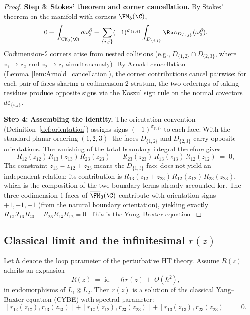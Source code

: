 \begin{proof}
\noindent\textbf{Step 3: Stokes' theorem and corner cancellation.}
By Stokes' theorem on the manifold with corners $\FM_3(\C)$,
\[
0 = \int_{\FM_3(\C)} d\omega_3^{\partial} = \sum_{\{i,j\}} (-1)^{\sigma_{\{i,j\}}} \int_{D_{\{i,j\}}} \Res_{D_{\{i,j\}}}(\omega_3^{\partial}).
\]
Codimension-2 corners arise from nested collisions (e.g., $D_{\{1,2\}} \cap D_{\{2,3\}}$, where $z_1 \to z_2$ and $z_2 \to z_3$ simultaneously). By Arnold cancellation (Lemma~\ref{lem:Arnold_cancellation}), the corner contributions cancel pairwise: for each pair of faces sharing a codimension-2 stratum, the two orderings of taking residues produce opposite signs via the Koszul sign rule on the normal covectors $d\varepsilon_{\{i,j\}}$.

\medskip
\noindent\textbf{Step 4: Assembling the identity.}
The orientation convention (Definition~\ref{def:orientation}) assigns signs $(-1)^{\sigma_{\{i,j\}}}$ to each face. With the standard planar ordering $(1,2,3)$, the faces $D_{\{1,2\}}$ and $D_{\{2,3\}}$ carry opposite orientations. The vanishing of the total boundary integral therefore gives
\[
R_{12}(z_{12})\,R_{13}(z_{13})\,R_{23}(z_{23}) \;-\; R_{23}(z_{23})\,R_{13}(z_{13})\,R_{12}(z_{12}) \;=\; 0,
\]
The constraint $z_{13} = z_{12} + z_{23}$ means the $D_{\{1,3\}}$ face does not yield an independent relation: its contribution is $R_{13}(z_{12}+z_{23})\,R_{12}(z_{12})\,R_{23}(z_{23})$, which is the composition of the two boundary terms already accounted for. The three codimension-$1$ faces of $\overline{\FM}_3(\C)$ contribute with orientation signs $+1, +1, -1$ (from the natural boundary orientation), yielding exactly $R_{12}R_{13}R_{23} - R_{23}R_{13}R_{12} = 0$. This is the Yang--Baxter equation.
\end{proof}

\subsection{Classical limit and the infinitesimal $r(z)$}
Let $\hbar$ denote the loop parameter of the perturbative HT theory.
Assume $R(z)$ admits an expansion
\[
R(z) \;=\; \mathrm{id} \,+\, \hbar\, r(z) \,+\, O(\hbar^2),
\]
in endomorphisms of $L_1\otimes L_2$.
Then $r(z)$ is a solution of the classical Yang–Baxter equation (CYBE) with spectral parameter:
\[
[ r_{12}(z_{12}), r_{13}(z_{13}) ] + [ r_{12}(z_{12}), r_{23}(z_{23}) ] + [ r_{13}(z_{13}), r_{23}(z_{23}) ] \;=\; 0.
\]

